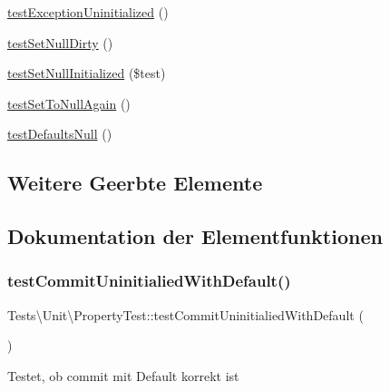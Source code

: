 \begin{DoxyCompactItemize}
\hyperlink{classTests_1_1Unit_1_1PropertyTest_a0836c737c012daffedb84763c5da272d}{test\+Exception\+Uninitialized} ()
\item 
\hyperlink{classTests_1_1Unit_1_1PropertyTest_abd2b8b277a51eb8f93695b023208d4cf}{test\+Set\+Null\+Dirty} ()
\item 
\hyperlink{classTests_1_1Unit_1_1PropertyTest_a5c7c54b6ff140cb9fae0cab1bdcaf8b4}{test\+Set\+Null\+Initialized} (\$test)
\item 
\hyperlink{classTests_1_1Unit_1_1PropertyTest_a47703bf4692ad1d954f5bd9843281083}{test\+Set\+To\+Null\+Again} ()
\item 
\hyperlink{classTests_1_1Unit_1_1PropertyTest_a4a56adcd2b4034a7e746086d4af7f5d8}{test\+Defaults\+Null} ()
\end{DoxyCompactItemize}
\subsection*{Weitere Geerbte Elemente}


\subsection{Dokumentation der Elementfunktionen}
\mbox{\label{classTests_1_1Unit_1_1PropertyTest_a830e701ccf9c9d47e4b652d8b245375c}} 
\subsubsection{\texorpdfstring{test\+Commit\+Uninitialied\+With\+Default()}{testCommitUninitialiedWithDefault()}}
{\footnotesize\ttfamily Tests\textbackslash{}\+Unit\textbackslash{}\+Property\+Test\+::test\+Commit\+Uninitialied\+With\+Default (\begin{DoxyParamCaption}{ }\end{DoxyParamCaption})}

Testet, ob commit mit Default korrekt ist \mbox{\label{classTests_1_1Unit_1_1PropertyTest_af5db0ed3d5dfed9d72b9fc1cc18804d7}} 

